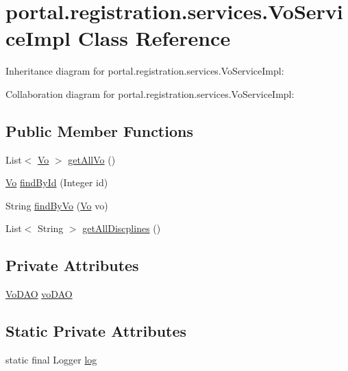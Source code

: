 \hypertarget{classportal_1_1registration_1_1services_1_1VoServiceImpl}{
\section{portal.registration.services.VoServiceImpl Class Reference}
\label{classportal_1_1registration_1_1services_1_1VoServiceImpl}
}


Inheritance diagram for portal.registration.services.VoServiceImpl:


Collaboration diagram for portal.registration.services.VoServiceImpl:
\subsection*{Public Member Functions}
\begin{DoxyCompactItemize}
\item 
List$<$ \hyperlink{classportal_1_1registration_1_1domain_1_1Vo}{Vo} $>$ \hyperlink{classportal_1_1registration_1_1services_1_1VoServiceImpl_aa5774cef8f51f0d1fa3db99fb52b5089}{getAllVo} ()
\item 
\hyperlink{classportal_1_1registration_1_1domain_1_1Vo}{Vo} \hyperlink{classportal_1_1registration_1_1services_1_1VoServiceImpl_a033d10a34bb55d383d9c9fbf8e06934d}{findById} (Integer id)
\item 
String \hyperlink{classportal_1_1registration_1_1services_1_1VoServiceImpl_ae34d214263258edd26540c6931c89f4a}{findByVo} (\hyperlink{classportal_1_1registration_1_1domain_1_1Vo}{Vo} vo)
\item 
List$<$ String $>$ \hyperlink{classportal_1_1registration_1_1services_1_1VoServiceImpl_a524d75940e34418e48a3d50a521490f5}{getAllDiscplines} ()
\end{DoxyCompactItemize}
\subsection*{Private Attributes}
\begin{DoxyCompactItemize}
\item 
\hyperlink{interfaceportal_1_1registration_1_1dao_1_1VoDAO}{VoDAO} \hyperlink{classportal_1_1registration_1_1services_1_1VoServiceImpl_a92aa539f17eb130f099f970cf9f408c1}{voDAO}
\end{DoxyCompactItemize}
\subsection*{Static Private Attributes}
\begin{DoxyCompactItemize}
\item 
static final Logger \hyperlink{classportal_1_1registration_1_1services_1_1VoServiceImpl_a9213c0db1eb0f44559f7e4c2ec13e0cf}{log}
\end{DoxyCompactItemize}


